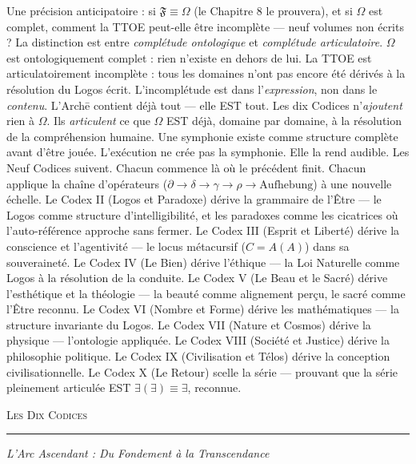 \documentclass[10pt, openany, oneside]{book}
\renewcommand{\large}{\fontsize{11.5}{14}\selectfont}
\newcommand{\separator}{%
    \begin{center}
        \vspace{0.3em}
        \rule{0.3\textwidth}{0.4pt}
        \vspace{0.3em}
    \end{center}
}
\begin{document}
Une précision anticipatoire : si $\mathfrak{F} \equiv \Omega$ (le Chapitre 8 le prouvera), et si $\Omega$ est complet, comment la TTOE peut-elle être incomplète --- neuf volumes non écrits ? La distinction est entre \textit{complétude ontologique} et \textit{complétude articulatoire}. $\Omega$ est ontologiquement complet : rien n'existe en dehors de lui. La TTOE est articulatoirement incomplète : tous les domaines n'ont pas encore été dérivés à la résolution du Logos écrit. L'incomplétude est dans l'\textit{expression}, non dans le \textit{contenu}. L'Arch\={e} contient déjà tout --- elle EST tout. Les dix Codices n'\textit{ajoutent} rien à $\Omega$. Ils \textit{articulent} ce que $\Omega$ EST déjà, domaine par domaine, à la résolution de la compréhension humaine. Une symphonie existe comme structure complète avant d'être jouée. L'exécution ne crée pas la symphonie. Elle la rend audible. Les Neuf Codices suivent. Chacun commence là où le précédent finit. Chacun applique la chaîne d'opérateurs ($\partial \to \delta \to \gamma \to \rho \to \text{Aufhebung}$) à une nouvelle échelle. Le Codex II (Logos et Paradoxe) dérive la grammaire de l'Être --- le Logos comme structure d'intelligibilité, et les paradoxes comme les cicatrices où l'auto-référence approche sans fermer. Le Codex III (Esprit et Liberté) dérive la conscience et l'agentivité --- le locus métacursif ($C = A(A)$) dans sa souveraineté. Le Codex IV (Le Bien) dérive l'éthique --- la Loi Naturelle comme Logos à la résolution de la conduite. Le Codex V (Le Beau et le Sacré) dérive l'esthétique et la théologie --- la beauté comme alignement perçu, le sacré comme l'Être reconnu. Le Codex VI (Nombre et Forme) dérive les mathématiques --- la structure invariante du Logos. Le Codex VII (Nature et Cosmos) dérive la physique --- l'ontologie appliquée. Le Codex VIII (Société et Justice) dérive la philosophie politique. Le Codex IX (Civilisation et Télos) dérive la conception civilisationnelle. Le Codex X (Le Retour) scelle la série --- prouvant que la série pleinement articulée EST $\exists(\exists) \equiv \exists$, reconnue.

\vspace{1.5em}

\begin{center}
    {\large\scshape Les Dix Codices}
\end{center}
\separator

\vspace{0.3em}

\begin{center}
    \itshape L'Arc Ascendant : Du Fondement à la Transcendance
\end{center}
\end{document}
